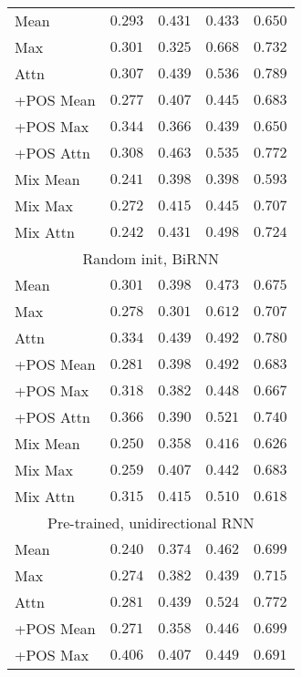 \begin{table}
\begin{tabular}{lrrrr}
    Mean & $0.293$ & $0.431$ & $0.433$ & $0.650$ \\
    Max & $0.301$ & $0.325$ & $\mathbf{0.668}$ & $0.732$ \\
    Attn & $0.307$ & $0.439$ & $0.536$ & $0.789$ \\
    +POS Mean & $0.277$ & $0.407$ & $0.445$ & $0.683$ \\
    +POS Max & $0.344$ & $0.366$ & $0.439$ & $0.650$ \\
    +POS Attn & $0.308$ & $0.463$ & $0.535$ & $0.772$ \\
    Mix Mean & $0.241$ & $0.398$ & $0.398$ & $0.593$ \\
    Mix Max & $0.272$ & $0.415$ & $0.445$ & $0.707$ \\
    Mix Attn & $0.242$ & $0.431$ & $0.498$ & $0.724$ \\
    \midrule \multicolumn{5}{c}{Random init, BiRNN} \\ \midrule
    Mean & $0.301$ & $0.398$ & $0.473$ & $0.675$ \\
    Max & $0.278$ & $0.301$ & $0.612$ & $0.707$ \\
    Attn & $0.334$ & $0.439$ & $0.492$ & $0.780$ \\
    +POS Mean & $0.281$ & $0.398$ & $0.492$ & $0.683$ \\
    +POS Max & $0.318$ & $0.382$ & $0.448$ & $0.667$ \\
    +POS Attn & $0.366$ & $0.390$ & $0.521$ & $0.740$ \\
    Mix Mean & $0.250$ & $0.358$ & $0.416$ & $0.626$ \\
    Mix Max & $0.259$ & $0.407$ & $0.442$ & $0.683$ \\
    Mix Attn & $0.315$ & $0.415$ & $0.510$ & $0.618$ \\
    \midrule \multicolumn{5}{c}{Pre-trained, unidirectional RNN} \\ \midrule
    Mean & $0.240$ & $0.374$ & $0.462$ & $0.699$ \\
    Max & $0.274$ & $0.382$ & $0.439$ & $0.715$ \\
    Attn & $0.281$ & $0.439$ & $0.524$ & $0.772$ \\
    +POS Mean & $0.271$ & $0.358$ & $0.446$ & $0.699$ \\
    +POS Max & $\mathbf{0.406}$ & $0.407$ & $0.449$ & $0.691$ \\

\end{tabular}
\end{table}
